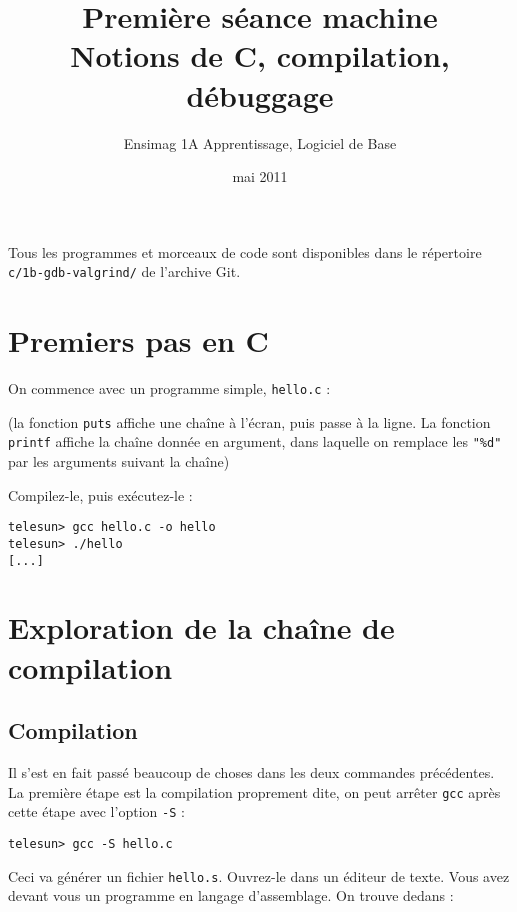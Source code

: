 \documentclass[11pt]{article}
\title{Première séance machine\\Notions de C, compilation, débuggage}
\author{Ensimag 1A Apprentissage, Logiciel de Base}
\date{mai 2011}
\begin{document}
\maketitle

Tous les programmes et morceaux de code sont disponibles dans le
répertoire \texttt{c/1b-gdb-valgrind/} de l'archive Git.

\section{Premiers pas en C}

On commence avec un programme simple, \texttt{hello.c} :



(la fonction \texttt{puts} affiche une chaîne à l'écran, puis passe à
la ligne. La fonction \texttt{printf} affiche la chaîne donnée en
argument, dans laquelle on remplace les \texttt{"\%d"} par les
arguments suivant la chaîne)


Compilez-le, puis exécutez-le :

\begin{verbatim}
telesun> gcc hello.c -o hello
telesun> ./hello
[...]
\end{verbatim}

\section{Exploration de la chaîne de compilation}

\subsection{Compilation}

Il s'est en fait passé beaucoup de choses dans les deux commandes
précédentes. La première étape est la compilation proprement dite, on
peut arrêter \texttt{gcc} après cette étape avec l'option
\texttt{-S} :

\begin{verbatim}
telesun> gcc -S hello.c
\end{verbatim}

Ceci va générer un fichier \texttt{hello.s}. Ouvrez-le dans un éditeur
de texte. Vous avez devant vous un programme en langage d'assemblage.
On trouve dedans :
\end{document}
